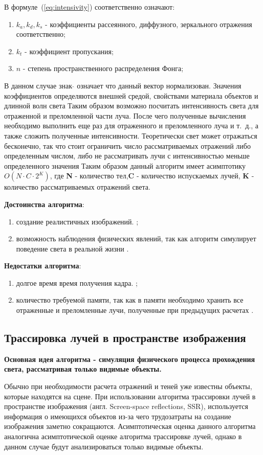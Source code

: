 В формуле~(\ref{eq:intensivity}) соответственно означают:
\begin{enumerate}
	\item $k_a,k_d,k_s$ - коэффициенты рассеянного, диффузного, зеркального отражения соответственно;
	\item $k_t$ - коэффициент пропускания;
	\item $n$ - степень пространственного распределения Фонга;
\end{enumerate}
В данном случае знак $ \hat{} $  означает что данный вектор нормализован.
Значения коэффициентов определяются внешней средой, свойствами материала объектов и длинной волн света
Таким образом возможно посчитать интенсивность света для отраженной и преломленной части луча.
После чего полученные вычисления необходимо выполнить еще раз для отраженного и преломленного луча и т.~д., а также сложить полученные интенсивности.
Теоретически свет может отражаться бесконечно, так что стоит ограничить число рассматриваемых отражений либо определенным числом,
либо не рассматривать лучи с интенсивностью меньше определенного значения
Таким образом данный алгоритм имеет асимптотику $O(N \cdot C \cdot 2^{K})$, где \textbf{N} - количество тел,\textbf{C} - количество испускаемых лучей,
\textbf{K} - количество рассматриваемых отражений света. \cite{Rodgers}



\textbf{Достоинства алгоритма}:
\begin{enumerate}
	\item создание реалистичных изображений. \cite{Rodgers,modern_ray_tracing,SSR};
	\item возможность наблюдения физических явлений, так как алгоритм симулирует поведение света в реальной жизни \cite{Rodgers,modern_ray_tracing,SSR}.
\end{enumerate}


\textbf{Недостатки алгоритма}:
\begin{enumerate}
	\item долгое время время получения кадра. \cite{Rodgers,modern_ray_tracing,SSR};
	\item количество требуемой памяти, так как в памяти необходимо хранить все отраженные и преломленные лучи, полученные при предыдущих расчетах \cite{Rodgers,modern_ray_tracing,SSR}.
\end{enumerate}


\subsection{Трассировка лучей в пространстве изображения}
\textbf{Основная идея алгоритма - симуляция физического процесса прохождения света, рассматривая только видимые объекты.} \par
Обычно при необходимости расчета отражений и теней уже известны объекты, которые находятся на сцене. При использовании алгоритма трассировки лучей в пространстве изображения (англ. Screen-space reflections, SSR), используется информация о имеющихся
объектов из-за чего трудозатраты на создание изображения заметно сокращаются.
Асимптотическая оценка данного алгоритма аналогична асимптотической оценке алгоритма трассировке лучей, однако в данном случае будут анализироваться только видимые объекты.\cite{SSR}

